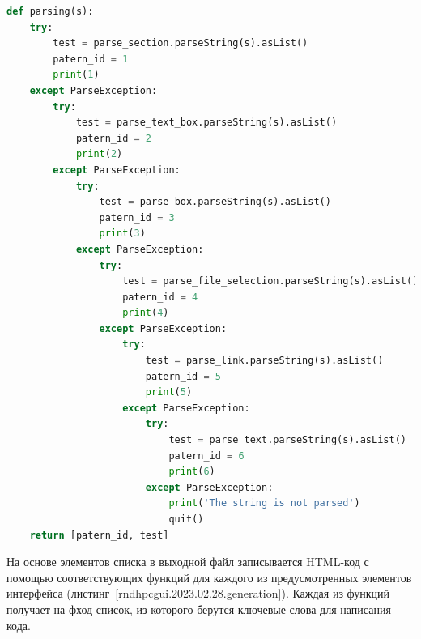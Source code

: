 \begin{lstlisting}[frame=single, label={rndhpcgui.2023.02.28.parsing}, caption={Функция parsing}, language={Python}] 
	def parsing(s):
    try:
        test = parse_section.parseString(s).asList()
        patern_id = 1
        print(1)
    except ParseException:
        try:
            test = parse_text_box.parseString(s).asList()
            patern_id = 2
            print(2)
        except ParseException:
            try:
                test = parse_box.parseString(s).asList()
                patern_id = 3
                print(3)
            except ParseException:
                try:
                    test = parse_file_selection.parseString(s).asList()
                    patern_id = 4
                    print(4)
                except ParseException:
                    try:
                        test = parse_link.parseString(s).asList()
                        patern_id = 5
                        print(5)
                    except ParseException:
                        try:
                            test = parse_text.parseString(s).asList()
                            patern_id = 6
                            print(6)
                        except ParseException:
                            print('The string is not parsed')
                            quit()
    return [patern_id, test]
\end{lstlisting}


На основе элементов списка в выходной файл записывается HTML-код с помощью соответствующих функций для каждого из предусмотренных элементов интерфейса (листинг~\ref{rndhpcgui.2023.02.28.generation}). Каждая из функций получает на фход список, из которого берутся ключевые слова для написания кода.



